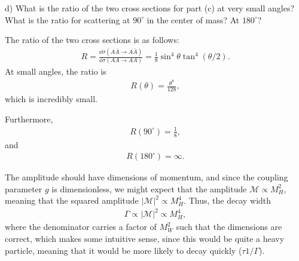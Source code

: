 d) What is the ratio of the two cross sections for part (c) at very small angles?
What is the ratio for scattering at $90^{\circ}$ in the center of mass?
At $180^{\circ}$?

The ratio of the two cross sections is as follows:
\begin{eqnarray}
    \label{eq:ratio}
    R = \frac{\dd{\sigma(A \bar{A} \rightarrow A \bar{A})}}{\dd{\sigma(AA \rightarrow AA)}} = \frac{1}{8} \sin^{4}{\theta}\tan^{4}{(\theta/2)}
.\end{eqnarray}
At small angles, the ratio is
\begin{eqnarray}
    \label{eq:ratio-small-angle}
    R(\theta) = \frac{\theta^{8}}{128}
,\end{eqnarray}
which is incredibly small.

Furthermore,
\begin{eqnarray}
    \label{eq:ratio-90}
    R(90^{\circ}) = \frac{1}{8} 
,\end{eqnarray}
and
\begin{eqnarray}
    \label{eq:ratio-180}
    R(180^{\circ}) = \infty
.\end{eqnarray}




The amplitude should have dimensions of momentum, and since the coupling parameter $g$ is dimensionless, we might expect that the amplitude $\mathcal{M} \propto M_{H}^2$, meaning that the squared amplitude $| \mathcal{M} |^2 \propto M_{H}^{4}$.
Thus, the decay width
\begin{eqnarray}
    \label{eq:decay-width}
    \Gamma \propto | \mathcal{M} |^2 \propto M_{H}^{4}
,\end{eqnarray}
where the denominator carries a factor of $M_{W}^2$ such that the dimensions are correct, which makes some intuitive sense, since this would be quite a heavy particle, meaning that it would be more likely to decay quickly ($\tau 1/\Gamma$).


